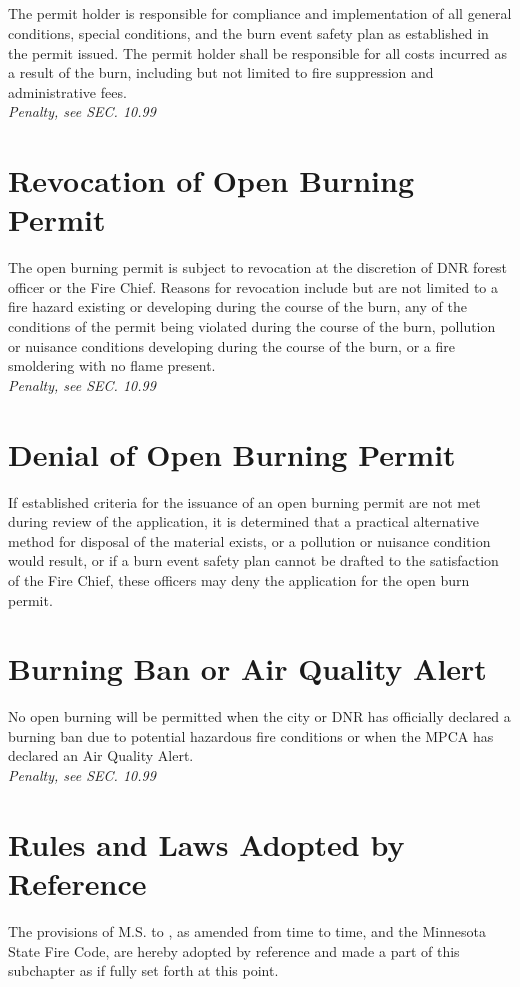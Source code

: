 \subsection{}
The permit holder is responsible for compliance and implementation of all general conditions, special conditions, and the burn event safety plan as established in the permit issued.  The permit holder shall be responsible for all costs incurred as a result of the burn, including but not limited to fire suppression and administrative fees.\\
\emph{Penalty, see SEC. 10.99}
\section{Revocation of Open Burning Permit}
The open burning permit is subject to revocation at the discretion of DNR forest officer or the Fire Chief.  Reasons for revocation include but are not limited to a fire hazard existing or developing during the course of the burn, any of the conditions of the permit being violated during the course of the burn, pollution or nuisance conditions developing during the course of the burn, or a fire smoldering with no flame present.\\
\emph{Penalty, see SEC. 10.99}
\section{Denial of Open Burning Permit}
If established criteria for the issuance of an open burning permit are not met during review of the application, it is determined that a practical alternative method for disposal of the material exists, or a pollution or nuisance condition would result, or if a burn event safety plan cannot be drafted to the satisfaction of the Fire Chief, these officers may deny the application for the open burn permit.
\section{Burning Ban or Air Quality Alert}
No open burning  will be permitted when the city or DNR has officially declared a burning ban due to potential hazardous fire conditions or when the MPCA has declared an Air Quality Alert.\\
\emph{Penalty, see SEC. 10.99}
\section{Rules and Laws Adopted by Reference}
The provisions of M.S.  to , as amended from time to time, and the Minnesota State Fire Code, are hereby adopted by reference and made a part of this subchapter as if fully set forth at this point.
